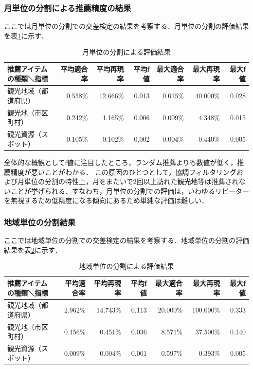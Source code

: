 \documentclass{jsarticle}
\begin{document}
\subsubsection{月単位の分割による推薦精度の結果}

ここでは月単位の分割での交差検定の結果を考察する．月単位の分割の評価結果を表\ref{result_monthly}に示す．

\begin{table}[!h]
\small
\caption{月単位の分割による評価結果}
\begin{center}
\begin{tabular}{lrrrrrr}
\label{result_monthly}
推薦アイテムの種類＼指標            & 平均適合率 & 平均再現率 & 平均f値 & 最大適合率 & 最大再現率 & 最大f値 \\ \hline
観光地域（都道府県）    & 0.558\% & 12.666\% & 0.013 & 0.015\% & 40.000\% & 0.028 \\
観光地（市区町村）      & 0.242\% &  1.165\% & 0.006 & 0.009\% &  4.348\% & 0.015 \\
観光資源（スポット）    & 0.105\% &  0.102\% & 0.002 & 0.004\% &  0.440\% & 0.005 \\
\end{tabular}
\end{center}
\end{table}

全体的な概観としてf値に注目したところ，ランダム推薦よりも数値が低く，推薦精度が悪いことがわかる．
この原因のひとつとして，協調フィルタリングおよび月単位の分割の特性上，月をまたいで2回以上訪れた観光地等は推薦されないことが挙げられる．すなわち，月単位の分割での評価は，いわゆるリピーターを無視するため低精度になる傾向にあるため単純な評価は難しい．

\subsubsection{地域単位の分割結果}

ここでは地域単位の分割での交差検定の結果を考察する．地域単位の分割の評価結果を表\ref{result_area}に示す．

\begin{table}[!h]
\small
\caption{地域単位の分割による評価結果}
\begin{center}
\begin{tabular}{lrrrrrr}
\label{result_area}
推薦アイテムの種類＼指標            & 平均適合率 & 平均再現率 & 平均f値 & 最大適合率 & 最大再現率 & 最大f値 \\ \hline
観光地域（都道府県）    & 2.962\% & 14.743\% & 0.113 & 20.000\% & 100.000\% & 0.333 \\
観光地（市区町村）      & 0.156\% &  0.451\% & 0.036 &  8.571\% &  37.500\% & 0.140 \\
観光資源（スポット）    & 0.009\% &  0.004\% & 0.001 &  0.597\% &   0.393\% & 0.005 \\
\end{tabular}
\end{center}
\end{table}
\end{document}
